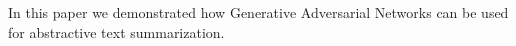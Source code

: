 \documentclass[sigplan]{acmart}
\begin{document}
In this paper we demonstrated how Generative Adversarial Networks can be used for abstractive text summarization.





\end{document}
